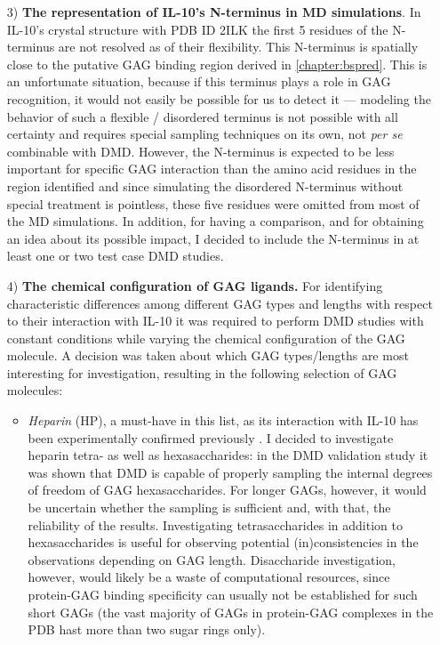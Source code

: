 \begin{itemize}
\item[3)] \textbf{The representation of IL-10's N-terminus in MD simulations}.
In IL-10's crystal structure with PDB ID 2ILK the first 5 residues of the
N-terminus are not resolved as of their flexibility. This N-terminus is
spatially close to the putative GAG binding region derived in
\cref{chapter:bspred}. This is an unfortunate situation, because if this
terminus plays a role in GAG recognition, it would not easily be possible for us
to detect it --- modeling the behavior of such a flexible / disordered terminus
is not possible with all certainty and requires special sampling techniques on
its own, not \textit{per se} combinable with DMD. However, the N-terminus is
expected to be less important for specific GAG interaction than the amino acid
residues in the region identified and since simulating the disordered N-terminus
without special treatment is pointless, these five residues were omitted from
most of the MD simulations. In addition, for having a comparison, and for
obtaining an idea about its possible impact, I decided to include the
N-terminus in at least one or two test case DMD studies.



\item[4)] \textbf{The chemical configuration of GAG ligands.} For identifying
characteristic differences among different GAG types and lengths with respect to
their interaction with IL-10 it was required to perform DMD studies with
constant conditions while varying the chemical configuration of the GAG
molecule. A decision was taken about which GAG types/lengths are most
interesting for investigation, resulting in the following selection of GAG
molecules:

\begin{itemize}

\item \textit{Heparin} (HP), a must-have in this list, as its interaction with
IL-10 has been experimentally confirmed previously \cite{salek_ardakani_2000}. I
decided to investigate heparin tetra- as well as hexasaccharides: in the DMD
validation study it was shown that DMD is capable of properly sampling the
internal degrees of freedom of GAG hexasaccharides. For longer GAGs, however, it
would be uncertain whether the sampling is sufficient and, with that, the
reliability of the results. Investigating tetrasaccharides in addition to
hexasaccharides is useful for observing potential (in)consistencies in the
observations depending on GAG length. Disaccharide investigation, however, would
likely be a waste of computational resources, since protein-GAG binding
specificity can usually not be established for such short GAGs (the vast
majority of GAGs in protein-GAG complexes in the PDB hast more than two sugar
rings only).


\end{itemize}
\end{itemize}

